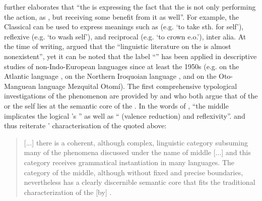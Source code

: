 \citet[18f.]{barber:1975} further elaborates that “the  is expressing the fact that the  is not only performing the action, as , but receiving some benefit from it as well”. For example, the Classical   can be used to express meanings such as  (e.g. ‘to take sth. for self’), reflexive (e.g. ‘to wash self’), and reciprocal (e.g. ‘to crown e.o.’), inter alia. At the time of writing, \cite[17]{barber:1975} argued that the “linguistic literature on the  is almost nonexistent”, yet it can be noted that the label “” has been applied in descriptive studies of non-Indo-European languages since at least the 1950s (e.g. \citealt{arnott:1956} on the Atlantic language , \citealt{chafe:1960} on the Northern Iroquoian language , and \citealt{wallis:1964} on the Oto-Manguean language Mezquital Otomí). The first comprehensive typological investigations of the phenomenon are provided by \citet{klaiman:1982, klaiman:1991} and \citet{kemmer:1993, kemmer:1994} who both argue that  of the  or the self lies at the semantic core of the . In the words of \citet[104f.]{klaiman:1991}, “the middle implicates the logical ’s ” as well as “ (valence reduction) and reflexivity”. \citeauthor{klaiman:1991} and \citeauthor{kemmer:1993} thus reiterate \citeauthor{lyons:1968}’ characterisation of the  quoted above:

\begin{quote}
	[...] there is a coherent, although complex, linguistic category subsuming many of the phenomena discussed under the name of middle [...] and this category receives grammatical instantiation in many languages. The category of the middle, although without fixed and precise boundaries, nevertheless has a clearly discernible semantic core that fits the traditional characterization of the  [by] \citeauthor{lyons:1968}. \citep[3]{kemmer:1993}
\end{quote} 

